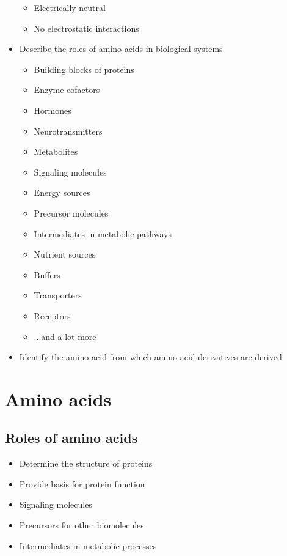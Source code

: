 \documentclass[letterpaper, 12pt]{article}
\begin{document}
\begin{itemize}
\begin{itemize}
\item Electrically neutral
\item No electrostatic interactions
\end{itemize}
\item Describe the roles of amino acids in biological systems
\begin{itemize}
\item Building blocks of proteins
\item Enzyme cofactors
\item Hormones
\item Neurotransmitters
\item Metabolites
\item Signaling molecules
\item Energy sources
\item Precursor molecules
\item Intermediates in metabolic pathways
\item Nutrient sources
\item Buffers
\item Transporters
\item Receptors
\item ...and a lot more
\end{itemize}
\item Identify the amino acid from which amino acid derivatives are derived
\end{itemize}

\newpage

\section*{Amino acids}

\subsection*{Roles of amino acids}

\begin{itemize}
\item Determine the structure of proteins
\item Provide basis for protein function
\item Signaling molecules
\item Precursors for other biomolecules
\item Intermediates in metabolic processes
\end{itemize}
\end{document}

